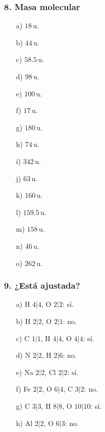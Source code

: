 \subsubsection*{8. Masa molecular}
\begin{enumerate}
    \item[a)] $18\,\mathrm{u}$.
    \item[b)] $44\,\mathrm{u}$.
    \item[c)] $58.5\,\mathrm{u}$.
    \item[d)] $98\,\mathrm{u}$.
    \item[e)] $100\,\mathrm{u}$.
    \item[f)] $17\,\mathrm{u}$.
    \item[g)] $180\,\mathrm{u}$.
    \item[h)] $74\,\mathrm{u}$.
    \item[i)] $342\,\mathrm{u}$.
    \item[j)] $63\,\mathrm{u}$.
    \item[k)] $160\,\mathrm{u}$.
    \item[l)] $159.5\,\mathrm{u}$.
    \item[m)] $158\,\mathrm{u}$.
    \item[n)] $46\,\mathrm{u}$.
    \item[o)] $262\,\mathrm{u}$.
\end{enumerate}

\subsubsection*{9. ¿Está ajustada?}
\begin{enumerate}
    \item[a)] H $4|4$, O $2|2$: sí.
    \item[b)] H $2|2$, O $2|1$: no.
    \item[c)] C $1|1$, H $4|4$, O $4|4$: sí.
    \item[d)] N $2|2$, H $2|6$: no.
    \item[e)] Na $2|2$, Cl $2|2$: sí.
    \item[f)] Fe $2|2$, O $6|4$, C $3|2$: no.
    \item[g)] C $3|3$, H $8|8$, O $10|10$: sí.
    \item[h)] Al $2|2$, O $6|3$: no.
\end{enumerate}

